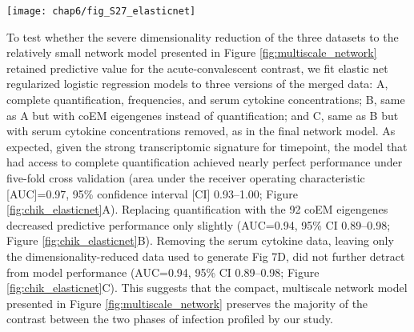 \begin{figure*}[htb]
  \centering
  \texttt{[image: chap6/fig\_S27\_elasticnet]}
  \caption[Performance of elastic net regression models for predicting timepoint]{
  \textbf{Receiver operator characteristic (ROC) curves measuring the performance of elastic net logistic regression models predicting the phase of infection} (acute vs. convalescent) for each sample, using progressively reduced versions of the dataset. Thin grey lines show the ROC curves for 100 bootstrap replicates. The area under the curve (AUC) along with its 95\% confidence interval are shown underneath each plot; a perfect classifier would achieve AUC=1 while a random classifier is expected to achieve AUC=0.5 (dashed diagonal line). A, model trained using all CyTOF sub-community frequencies, all quantified RNA-seq transcripts, and all Luminex cytokine measurements achieves near-perfect performance. B, model trained as in A with eigengene values for 92 coexpression modules replacing the RNA-seq transcript-level quantification; performance is slightly decreased but remains within the confidence interval for A’s AUC. C, model trained as in B with Luminex cytokine measurements removed; performance is equivalent to the model trained in B.
  }
  \label{fig:chik_elasticnet}
\end{figure*}

To test whether the severe dimensionality reduction of the three datasets to the relatively small network model presented in Figure \ref{fig:multiscale_network} retained predictive value for the acute-convalescent contrast, we fit elastic net regularized logistic regression models to three versions of the merged data: A, complete \pertranscript{} quantification, \subcommunity{} frequencies, and serum cytokine concentrations; B, same as A but with coEM eigengenes instead of \pertranscript{} quantification; and C, same as B but with serum cytokine concentrations removed, as in the final network model. As expected, given the strong transcriptomic signature for timepoint, the model that had access to complete \pertranscript{} quantification achieved nearly perfect performance under five-fold cross validation (area under the receiver operating characteristic [AUC]=0.97, 95\% confidence interval [CI] 0.93–1.00; Figure \ref{fig:chik_elasticnet}A). Replacing \pertranscript{} quantification with the 92 coEM eigengenes decreased predictive performance only slightly (AUC=0.94, 95\% CI 0.89–0.98; Figure \ref{fig:chik_elasticnet}B). Removing the serum cytokine data, leaving only the dimensionality-reduced data used to generate Fig 7D, did not further detract from model performance (AUC=0.94, 95\% CI 0.89–0.98; Figure \ref{fig:chik_elasticnet}C). This suggests that the compact, multiscale network model presented in Figure \ref{fig:multiscale_network} preserves the majority of the contrast between the two phases of infection profiled by our study.

